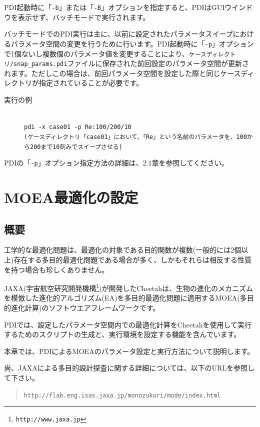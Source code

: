 \documentclass[a4paper,11pt]{jarticle}
\begin{document}
{PDI起動時に「{\tt -b}」または「{\tt -B}」オプションを指定すると、PDIはGUIウインドウを表示せず、バッチモードで実行されます。

バッチモードでのPDI実行は主に、以前に設定されたパラメータスイープにおけるパラメータ空間の変更を行うために行います。PDI起動時に「{\tt -p}」オプションで1個ないし複数個のパラメータ値を変更することにより、{\tt ケースディレクトリ/snap\_params.pdi}ファイルに保存された前回設定のパラメータ空間が更新されます。ただしこの場合は、前回パラメータ空間を設定した際と同じケースディレクトリが指定されていることが必要です。

\begin{description}
\item[実行の例] {\ }\\
{\tt pdi  -x case01  -p Re:100/200/10}\\
{\tt (ケースディレクトリ「case01」において、「Re」という名前のパラメータを、100から200まで10刻みでスイープさせる)}
\end{description}

PDIの「{\tt -p}」オプション指定方法の詳細は、2.1章を参照してください。

\newpage
\section{MOEA最適化の設定}

\subsection{概要}

工学的な最適化問題は、最適化の対象である目的関数が複数(一般的には2個以上)存在する多目的最適化問題である場合が多く、しかもそれらは相反する性質を持つ場合も珍しくありません。

JAXA(宇宙航空研究開発機構\footnote{\tt http://www.jaxa.jp})が開発したCheetahは、生物の進化のメカニズムを模倣した進化的アルゴリズム(EA)を多目的最適化問題に適用するMOEA(多目的進化計算)のソフトウエアフレームワークです。

PDIでは、設定したパラメータ空間内での最適化計算をCheetahを使用して実行するためのスクリプトの生成と、実行環境を設定する機能を含んでいます。

本章では、PDIによるMOEAのパラメータ設定と実行方法について説明します。

尚、JAXAによる多目的設計探査に関する詳細については、以下のURLを参照して下さい。
\begin{quote}
{\tt http://flab.eng.isas.jaxa.jp/monozukuri/mode/index.html}
\end{quote}


}
\end{document}
